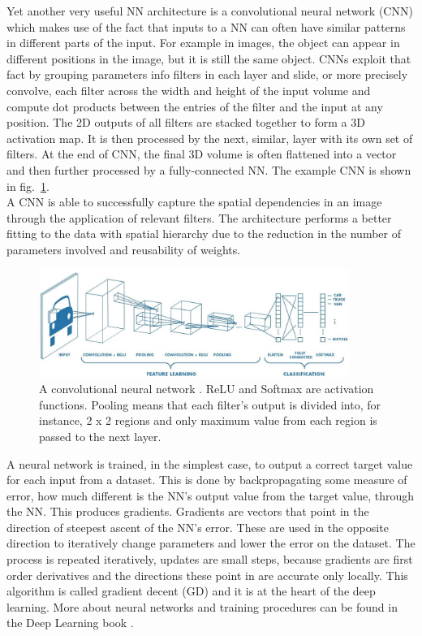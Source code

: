 Yet another very useful NN architecture is a convolutional neural network (CNN) which makes use of the fact that inputs to a NN can often have similar patterns in different parts of the input. For example in images, the object can appear in different positions in the image, but it is still the same object. CNNs exploit that fact by grouping parameters info filters in each layer and slide, or more precisely convolve, each filter across the width and height of the input volume and compute dot products between the entries of the filter and the input at any position. The 2D outputs of all filters are stacked together to form a 3D activation map. It is then processed by the next, similar, layer with its own set of filters. At the end of CNN, the final 3D volume is often flattened into a vector and then further processed by a fully-connected NN. The example CNN is shown in fig.~\ref{Fig.CNN}. \\
A CNN is able to successfully capture the spatial dependencies in an image through the application of relevant filters. The architecture performs a better fitting to the data with spatial hierarchy due to the reduction in the number of parameters involved and reusability of weights.

\begin{figure}[H]
\includegraphics[width=0.9\textwidth,keepaspectratio]{figures/CNN.png}
\caption[A convolutional neural network]{A convolutional neural network \cite{Blog.CNNs}. ReLU \cite{Algo.ReLU} and Softmax are activation functions. Pooling means that each filter's output is divided into, for instance, 2 x 2 regions and only maximum value from each region is passed to the next layer.}
\label{Fig.CNN}
\end{figure}

A neural network is trained, in the simplest case, to output a correct target value for each input from a dataset. This is done by backpropagating some measure of error, how much different is the NN's output value from the target value, through the NN. This produces gradients. Gradients are vectors that point in the direction of steepest ascent of the NN's error. These are used in the opposite direction to iteratively change parameters and lower the error on the dataset. The process is repeated iteratively, updates are small steps, because gradients are first order derivatives and the directions these point in are accurate only locally. This algorithm is called gradient decent (GD) and it is at the heart of the deep learning. More about neural networks and training procedures can be found in the Deep Learning book \cite{Book.DeepLearning}.

